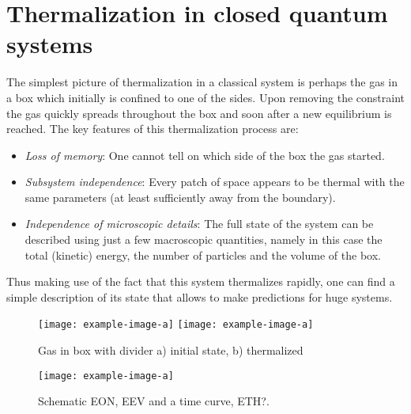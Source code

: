 \section{Thermalization in closed quantum systems}
\label{sec:Thermalization-in-closed-QS}
The simplest picture of thermalization in a classical system is perhaps the gas in a box which initially is confined to one of the sides. Upon removing the constraint the gas quickly spreads throughout the box and soon after a new equilibrium is reached. The key features of this thermalization process are:
\begin{itemize}
	\item \emph{Loss of memory}: One cannot tell on which side of the box the gas started.
	\item \emph{Subsystem independence}: Every patch of space appears to be thermal with the same parameters (at least sufficiently away from the boundary).
	\item \emph{Independence of microscopic details}: The full state of the system can be described using just a few macroscopic quantities, namely in this case the total (kinetic) energy, the number of particles and the volume of the box.
\end{itemize}
Thus making use of the fact that this system thermalizes rapidly, one can find a simple description of its state that allows to make predictions for huge systems.

\begin{figure}[htb]
	\centering
	\texttt{[image: example-image-a]}
	\hfill
	\texttt{[image: example-image-a]}
	\caption{Gas in box with divider a) initial state, b) thermalized}
\end{figure}



\begin{figure}[htb]
	\centering
	\texttt{[image: example-image-a]}
	\caption{Schematic EON, EEV and a time curve, ETH?.}
\end{figure}

